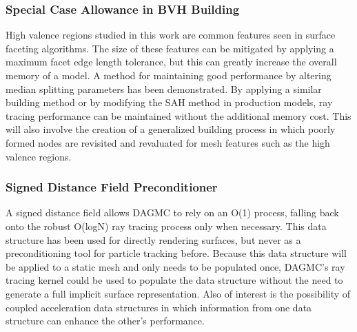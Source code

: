 \documentclass[12pt, a4paper]{article}
\begin{document}
\subsubsection{Special Case Allowance in BVH Building}

High valence regions studied in this work are common features seen in surface faceting algorithms. The size of these features can be mitigated by applying a maximum facet edge length tolerance, but this can greatly increase the overall memory of a model. A method for maintaining good performance by altering median splitting parameters has been demonstrated. By applying a similar building method or by modifying the SAH method in production models, ray tracing performance can be maintained without the additional memory cost. This will also involve the creation of a generalized building process in which poorly formed nodes are revisited and revaluated for mesh features such as the high valence regions.

\subsubsection{Signed Distance Field Preconditioner}

A signed distance field allows DAGMC to rely on an O(1) process, falling back onto the robust O(logN) ray tracing process only when necessary. This data structure has been used for directly rendering surfaces, but never as a preconditioning tool for particle tracking before. Because this data structure will be applied to a static mesh and only needs to be populated once, DAGMC's ray tracing kernel could be used to populate the data structure without the need to generate a full implicit surface representation. Also of interest is the possibility of coupled acceleration data structures in which information from one data structure can enhance the other's performance.



\end{document}
